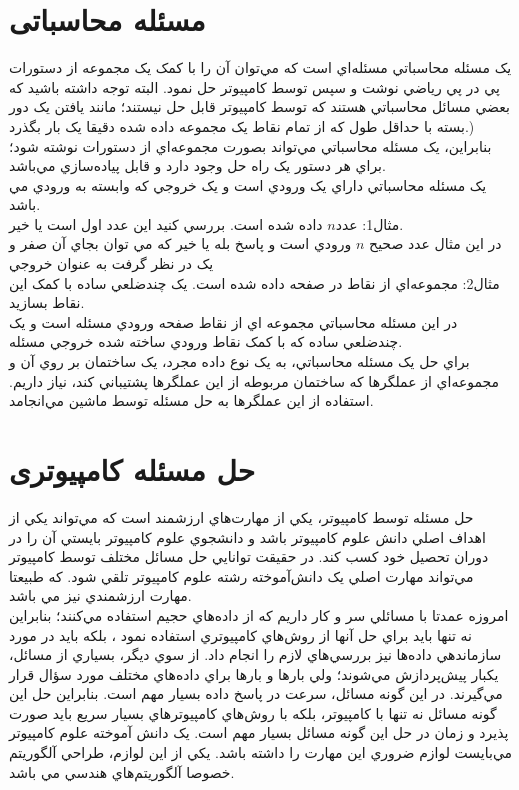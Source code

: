 \documentclass{book}
\begin{document}
\section*{مسئله محاسباتی}
يک مسئله محاسباتي مسئله‌اي است که مي‌توان آن‌ را با کمک يک مجموعه از دستورات پي در پي رياضي نوشت و سپس توسط کامپيوتر حل نمود. البته توجه داشته باشيد که بعضي مسائل محاسباتي هستند که توسط کامپيوتر قابل حل نيستند؛ مانند يافتن يک دور بسته با حداقل طول که از تمام نقاط يک مجموعه داده شده دقيقا يک بار  بگذرد.)\\
بنابراين، يک مسئله محاسباتي مي‌تواند بصورت مجموعه‌اي از دستورات نوشته شود؛ براي هر دستور يک راه حل وجود دارد و قابل پياده‌سازي مي‌باشد. \\
يک مسئله محاسباتي داراي يک ورودي است و يک خروجي که وابسته به ورودي مي باشد.\\
مثال1:  عدد$n$ داده شده است. بررسي کنيد اين عدد اول است يا خير.\\
در اين مثال عدد صحيح $n$ ورودي است و پاسخ بله يا خير که مي توان بجاي آن صفر و يک در نظر گرفت به عنوان خروجي \\
مثال2: مجموعه‌اي از نقاط در صفحه داده شده است. يک چندضلعي ساده با کمک اين نقاط بسازيد.\\
در اين مسئله محاسباتي مجموعه اي از نقاط صفحه ورودي مسئله است و يک چندضلعي ساده که با کمک نقاط ورودي ساخته شده خروجي مسئله.   \\
براي حل يک مسئله محاسباتي، به يک نوع داده مجرد، يک ساختمان بر روي آن و مجموعه‌اي از عملگرها که ساختمان مربوطه از اين عملگرها پشتيباني کند، نياز داريم. استفاده از اين عملگرها به حل مسئله توسط ماشين مي‌انجامد. 
\section*{حل مسئله کامپیوتری}
حل مسئله توسط کامپيوتر، يکي از مهارت‌هاي ارزشمند است که مي‌تواند يکي از اهداف اصلي دانش علوم کامپيوتر باشد و دانشجوي علوم کامپيوتر بايستي آن‌ را در دوران تحصيل خود کسب کند. در حقيقت توانايي حل مسائل مختلف توسط کامپيوتر مي‌تواند مهارت اصلي يک دانش‌آموخته رشته علوم کامپيوتر تلقي شود. که طبيعتا مهارت ارزشمندي نيز مي باشد.\\
امروزه عمدتا با مسائلي سر و کار داريم که از داده‌هاي حجيم استفاده مي‌کنند؛ بنابراين نه تنها بايد براي حل آنها از روش‌هاي کامپيوتري استفاده نمود ، بلکه بايد در مورد سازماندهي داده‌ها نيز بررسي‌هاي لازم را انجام داد. از سوي ديگر، بسياري از مسائل، يکبار پيش‌پردازش مي‌شوند؛ ولي بارها و بارها براي داده‌هاي مختلف مورد سؤال قرار مي‌گيرند. در اين گونه مسائل، سرعت در پاسخ داده بسيار مهم است. بنابراين حل اين گونه مسائل نه تنها با کامپيوتر، بلکه با روش‌هاي کامپيوترهاي بسيار سريع بايد صورت پذيرد و زمان در حل اين گونه مسائل بسيار مهم است. يک دانش آموخته علوم کامپيوتر مي‌بايست لوازم ضروري اين مهارت را داشته باشد. يکي از اين لوازم، طراحي آلگوريتم خصوصا آلگوريتم‌هاي هندسي مي باشد.\\
\end{document}
